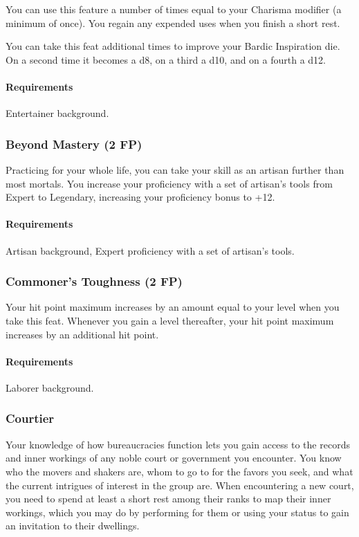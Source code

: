     You can use this feature a number of times equal to your Charisma modifier (a minimum of once).
    You regain any expended uses when you finish a short rest.

    You can take this feat additional times to improve your Bardic Inspiration die.
    On a second time it becomes a d8, on a third a d10, and on a fourth a d12.

    \paragraph{Requirements} Entertainer background.
\subsubsection{Beyond Mastery (2 FP)} \label{feat::beyondmastery}
    Practicing for your whole life, you can take your skill as an artisan further than most mortals.
    You increase your proficiency with a set of artisan's tools from Expert to Legendary, increasing your proficiency bonus to +12.
    \paragraph{Requirements} Artisan background, Expert proficiency with a set of artisan's tools.
\subsubsection{Commoner's Toughness (2 FP)} \label{feat::commonerstoughness}
    Your hit point maximum increases by an amount equal to your level when you take this feat.
    Whenever you gain a level thereafter, your hit point maximum increases by an additional hit point.
    \paragraph{Requirements} Laborer background.
\subsubsection{Courtier} \label{feat::courtier}
    Your knowledge of how bureaucracies function lets you gain access to the records and inner workings of any noble court or government you encounter.
    You know who the movers and shakers are, whom to go to for the favors you seek, and what the current intrigues of interest in the group are.
    When encountering a new court, you need to spend at least a short rest among their ranks to map their inner workings, which you may do by performing for them or using your status to gain an invitation to their dwellings.
